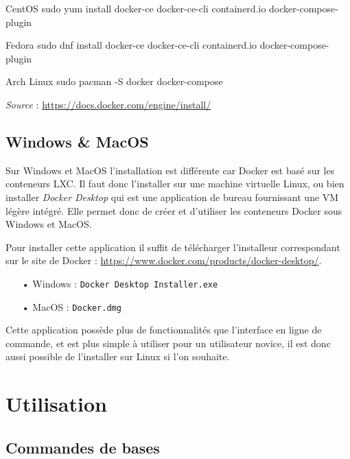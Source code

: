 \begin{bashWithTitle}{CentOS}
sudo yum install docker-ce docker-ce-cli containerd.io docker-compose-plugin
\end{bashWithTitle}

\begin{bashWithTitle}{Fedora}
sudo dnf install docker-ce docker-ce-cli containerd.io docker-compose-plugin
\end{bashWithTitle}

\begin{bashWithTitle}{Arch Linux}
sudo pacman -S docker docker-compose
\end{bashWithTitle}

\emph{Source} :
\href{https://docs.docker.com/engine/install/}{https://docs.docker.com/engine/install/}

\section{Windows \& MacOS}

Sur Windows et MacOS l'installation est différente car Docker est basé sur les conteneurs LXC.
Il faut donc l'installer sur une machine virtuelle Linux, ou bien installer \emph{Docker Desktop}
qui est une application de bureau fournissant une VM légère intégré. Elle permet donc de créer
et d'utiliser les conteneurs Docker sous Windows et MacOS.\newline

Pour installer cette application il suffit de télécharger l'installeur correspondant sur le site
de Docker : \href{https://www.docker.com/products/docker-desktop/}{https://www.docker.com/products/docker-desktop/}.

\begin{itemize}
    \item[•] Windows : \verb:Docker Desktop Installer.exe:
    \item[•] MacOS : \verb:Docker.dmg:
\end{itemize}

Cette application possède plus de fonctionnalités que l'interface en ligne de commande, et est plus
simple à utiliser pour un utilisateur novice, il est donc aussi possible de l'installer sur Linux
si l'on souhaite.

\chapter{Utilisation}

\section{Commandes de bases}

